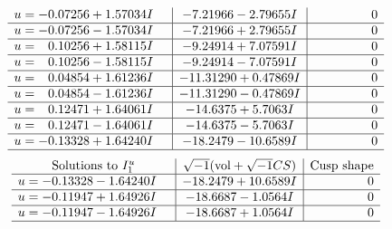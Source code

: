\documentclass[1p]{elsarticle_modified}
\theoremstyle{definition}
\newcommand{\I}{\sqrt{-1}}
\begin{document}
$$\begin{array}{c|c|c}
\begin{aligned}
u &= -0.07256 + 1.57034 I\end{aligned}
 & -7.21966 - 2.79655 I & \phantom{-0.000000 } 0 \\ \hline\begin{aligned}
u &= -0.07256 - 1.57034 I\end{aligned}
 & -7.21966 + 2.79655 I & \phantom{-0.000000 } 0 \\ \hline\begin{aligned}
u &= \phantom{-}0.10256 + 1.58115 I\end{aligned}
 & -9.24914 + 7.07591 I & \phantom{-0.000000 } 0 \\ \hline\begin{aligned}
u &= \phantom{-}0.10256 - 1.58115 I\end{aligned}
 & -9.24914 - 7.07591 I & \phantom{-0.000000 } 0 \\ \hline\begin{aligned}
u &= \phantom{-}0.04854 + 1.61236 I\end{aligned}
 & -11.31290 + 0.47869 I & \phantom{-0.000000 } 0 \\ \hline\begin{aligned}
u &= \phantom{-}0.04854 - 1.61236 I\end{aligned}
 & -11.31290 - 0.47869 I & \phantom{-0.000000 } 0 \\ \hline\begin{aligned}
u &= \phantom{-}0.12471 + 1.64061 I\end{aligned}
 & -14.6375 + 5.7063 I & \phantom{-0.000000 } 0 \\ \hline\begin{aligned}
u &= \phantom{-}0.12471 - 1.64061 I\end{aligned}
 & -14.6375 - 5.7063 I & \phantom{-0.000000 } 0 \\ \hline\begin{aligned}
u &= -0.13328 + 1.64240 I\end{aligned}
 & -18.2479 - 10.6589 I & \phantom{-0.000000 } 0\\
 \hline 
 \end{array}$$\newpage$$\begin{array}{c|c|c}  
\text{Solutions to }I^u_{1}& \I (\text{vol} + \sqrt{-1}CS) & \text{Cusp shape}\\
 \hline 
\begin{aligned}
u &= -0.13328 - 1.64240 I\end{aligned}
 & -18.2479 + 10.6589 I & \phantom{-0.000000 } 0 \\ \hline\begin{aligned}
u &= -0.11947 + 1.64926 I\end{aligned}
 & -18.6687 - 1.0564 I & \phantom{-0.000000 } 0 \\ \hline\begin{aligned}
u &= -0.11947 - 1.64926 I\end{aligned}
 & -18.6687 + 1.0564 I & \phantom{-0.000000 } 0\\
 \hline 
 \end{array}$$\newpage
\end{document}

